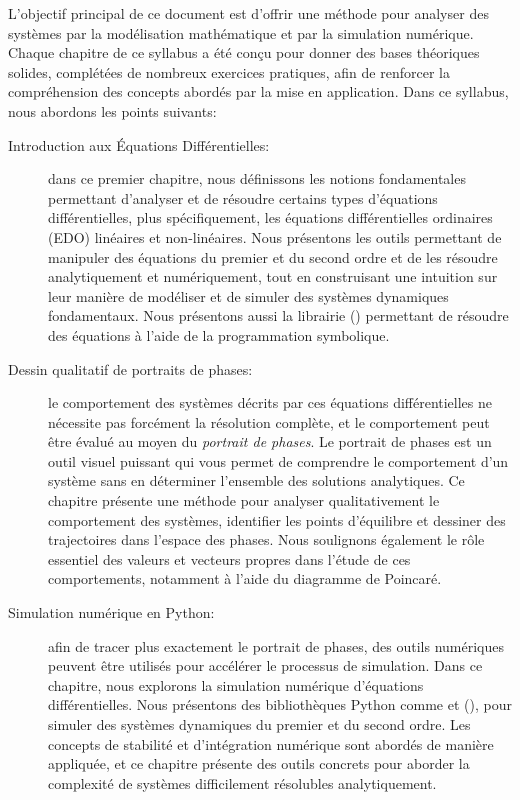     L'objectif principal de ce document est d'offrir une méthode pour analyser des systèmes par la modélisation mathématique et par la simulation numérique. Chaque chapitre de ce syllabus a été conçu pour donner des bases théoriques solides, complétées de nombreux exercices pratiques, afin de renforcer la compréhension des concepts abordés par la mise en application. 
    Dans ce syllabus, nous abordons les points suivants:
    \begin{description}
        \item[Introduction aux Équations Différentielles:] dans ce premier chapitre, nous définissons les notions fondamentales permettant d'analyser et de résoudre certains types d'équations différentielles, plus spécifiquement, les équations différentielles ordinaires (EDO) linéaires et non-linéaires. Nous présentons les outils permettant de manipuler des équations du premier et du second ordre et de les résoudre analytiquement et numériquement, tout en construisant une intuition sur leur manière de modéliser et de simuler des systèmes dynamiques fondamentaux. Nous présentons aussi la librairie  (\cite{Sympy2017}) permettant de résoudre des équations à l'aide de la programmation symbolique.
        \item[Dessin qualitatif de portraits de phases:] le comportement des systèmes décrits par ces équations différentielles ne nécessite pas forcément la résolution complète, et le comportement peut être évalué au moyen du \textit{portrait de phases}. Le portrait de phases est un outil visuel puissant qui vous permet de comprendre le comportement d'un système sans en déterminer l'ensemble des solutions analytiques. Ce chapitre présente une méthode pour analyser qualitativement le comportement des systèmes, identifier les points d’équilibre et dessiner des trajectoires dans l’espace des phases. Nous soulignons également le rôle essentiel des valeurs et vecteurs propres dans l'étude de ces comportements, notamment à l'aide du diagramme de Poincaré.
        \item[Simulation numérique en Python:] afin de tracer plus exactement le portrait de phases, des outils numériques peuvent être utilisés pour accélérer le processus de simulation. Dans ce chapitre, nous explorons la simulation numérique d’équations différentielles. Nous présentons des bibliothèques Python comme  et  (\cite{Numpy2020, Scipy2020}), pour simuler des systèmes dynamiques du premier et du second ordre. Les concepts de stabilité et d’intégration numérique sont abordés de manière appliquée, et ce chapitre présente des outils concrets pour aborder la complexité de systèmes difficilement résolubles analytiquement. 

\end{description}
